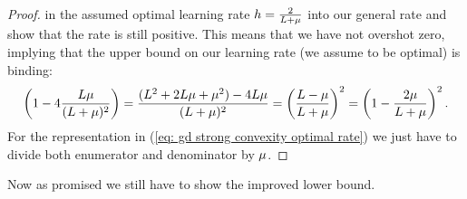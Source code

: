\begin{proof}
	in the assumed optimal learning rate \(h=\tfrac2{L+\mu}\) into
	our general rate and show that the rate is still positive. This means that
	we have not overshot zero, implying that the upper bound on our learning
	rate (we assume to be optimal) is binding:
	\begin{align*}
		\left(1- 4 \frac{L\mu}{(L+\mu)^2}\right)
		= \frac{(L^2 + 2L\mu + \mu^2) - 4 L\mu}{(L+\mu)^2}
		= \left(\frac{L-\mu}{L+\mu}\right)^2
		= \left(1-\frac{2\mu}{L+\mu}\right)^2.
	\end{align*}
	For the representation in (\ref{eq: gd strong convexity optimal rate}) we
	just have to divide both enumerator and denominator by \(\mu\).
\end{proof}

Now as promised we still have to show the improved lower bound.

